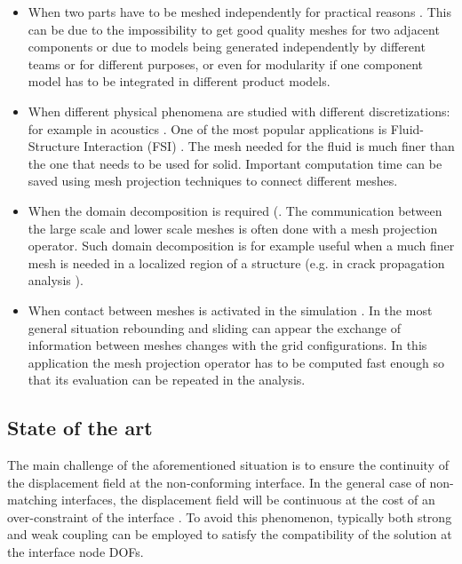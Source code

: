  \begin{itemize}
     \item When two parts have to be meshed independently for practical reasons \cite{barlow1982constraint,quiroz1995non}. This can be due to the impossibility to get good quality meshes for two adjacent components or due to models being generated independently by different teams or for different purposes, or even for modularity if one component model has to be integrated in different product models. 
     \item When different physical phenomena are studied with different discretizations: for example in acoustics \cite{flemisch2012non}. One of the most popular applications is Fluid-Structure Interaction (FSI) \cite{de2007review,de2008comparison,hou2012numerical,beckert2001multivariate,cebrali1997conservative,lohner1998fluid,farhat1998load}. The mesh needed for the fluid is much finer than the one that needs to be used for solid. Important computation time can be saved using mesh projection techniques to connect different meshes.
     \item When the domain decomposition is required (\cite{brandt2002multiscale,feyel2000fe,duval2016non,farhat1991method,mandel1993balancing}. The communication between the large scale and lower scale meshes is often done with a mesh projection operator. Such domain decomposition is for example useful when a much finer mesh is needed in a localized region of a structure (e.g. in crack propagation analysis \cite{duval2016non,lloberas2012micro,lloberas2012multiscale}).
     \item When contact between meshes is activated in the simulation \cite{wriggers1995finite,shillor20047,sofonea2005analysis,christensen1998formulation}. In the most general situation rebounding and sliding can appear the exchange of information between meshes changes  with the grid configurations. In this application the mesh projection operator has to be computed fast enough so that its evaluation can be repeated in the analysis.
 \end{itemize}
 \subsection{State of the art}
 The main challenge of the aforementioned situation is to ensure the continuity of the displacement field at the non-conforming interface. In the general case of non-matching interfaces, the displacement field will be continuous at the cost of an over-constraint of the interface \cite{rixen1997substructuring}. To avoid this phenomenon, typically both strong and weak coupling can be employed to satisfy the compatibility of the solution at the interface node DOFs.
